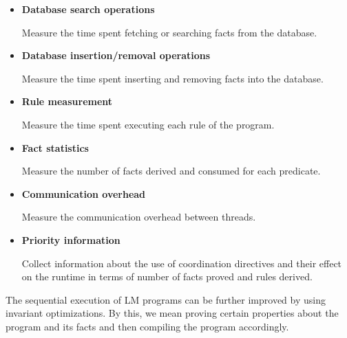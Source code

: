 \begin{itemize}
   \item \textbf{Database search operations}
   
   Measure the time spent fetching or searching facts from the database.
   
   \item \textbf{Database insertion/removal operations}
   
   Measure the time spent inserting and removing facts into the database.
   
   \item \textbf{Rule measurement}
   
   Measure the time spent executing each rule of the program.
   
   \item \textbf{Fact statistics}
   
   Measure the number of facts derived and consumed for each predicate.
   
   \item \textbf{Communication overhead}
   
   Measure the communication overhead between threads.

   \item \textbf{Priority information}

   Collect information about the use of coordination directives and their effect on the runtime in terms of number of facts proved and rules derived.
\end{itemize}

The sequential execution of LM programs can be further improved by using invariant optimizations.
By this, we mean proving certain properties about the program and its facts and then compiling the program accordingly.


